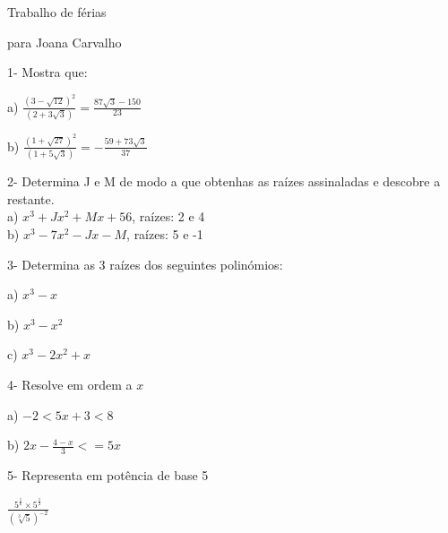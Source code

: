 \documentclass[11pt]{article}
\begin{document}
\begin{center}
{\huge Trabalho de férias}
\end{center}
\begin{center}
{\huge para Joana Carvalho}
\end{center}
\vspace{10mm}

{\large 1- Mostra que:}
\begin{multicols}{2}
a) $ \frac {(3 - \sqrt{12})^{2} }  {(2 + 3 \sqrt{3} )}= \frac{87 \sqrt{3} - 150}{23}$

b) $ \frac {(1 + \sqrt{27})^{2} }  {(1 + 5 \sqrt{3} )}= -\frac{59 + 73 \sqrt{3}}{37}$\\
\end{multicols}
\vspace{5mm}

{\large 2- Determina J e M de modo a que obtenhas as raízes assinaladas e descobre a restante.}\\

a) $x^{3}+Jx^{2} + Mx+56$, raízes: 2 e 4\\

b) $x^3-7x^2-Jx-M$, raízes: 5 e -1\\
\vspace{5mm}

{\large 3- Determina as 3 raízes dos seguintes polinómios:}
\begin{multicols}{3}
a) $x^3-x$

b) $x^3-x^2$

c) $x^3-2x^2+x$
\end{multicols}
\vspace{5mm}

{\large 4- Resolve em ordem a $x$}
\begin{multicols}{2}
a) $-2<5x+3<8$

b) $2x-\frac{4-x}{3}<=5x$
\end{multicols}
\vspace{5mm}

{\large 5- Representa em potência de base 5}

\vspace{5mm}
\begin{center} 
{\large $\frac{5^{\frac{1}{6}}\times5^{\frac{1}{2}}}{(\sqrt[3]{5})^{-2}}$}
\end{center}
\end{document}
